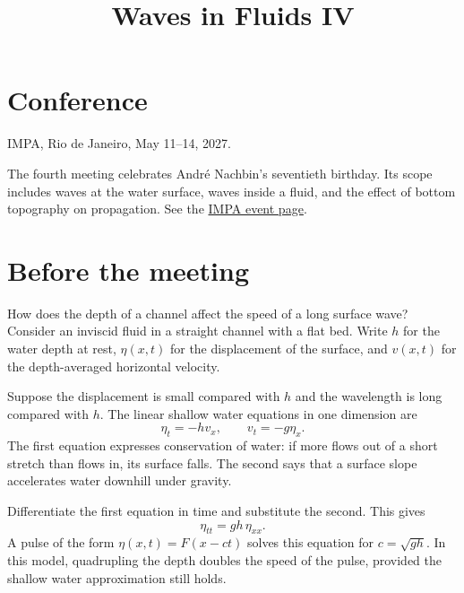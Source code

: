 



\title{Waves in Fluids IV}
\maketitle

\tableofcontents

\section{Conference}

IMPA, Rio de Janeiro, May 11--14, 2027.

The fourth meeting celebrates Andr\'e
Nachbin's seventieth birthday. Its scope
includes waves at the water surface, waves
inside a fluid, and the effect of bottom
topography on propagation. See the
\href{https://impa.br/evento/%
waves-in-fluids-iv/}{IMPA event page}.

\section{Before the meeting}

How does the depth of a channel affect the
speed of a long surface wave? Consider an
inviscid fluid in a straight channel with
a flat bed. Write $h$ for the water depth
at rest, $\eta(x,t)$ for the displacement
of the surface, and $v(x,t)$ for the
depth-averaged horizontal velocity.

Suppose the displacement is small compared
with $h$ and the wavelength is long
compared with $h$. The linear shallow
water equations in one dimension are
$$
\eta_t=-h v_x,\qquad v_t=-g\eta_x.
$$
The first equation expresses conservation
of water: if more flows out of a short
stretch than flows in, its surface falls.
The second says that a surface slope
accelerates water downhill under gravity.

Differentiate the first equation in time
and substitute the second. This gives
$$
\eta_{tt}=gh\,\eta_{xx}.
$$
A pulse of the form $\eta(x,t)=F(x-ct)$
solves this equation for $c=\sqrt{gh}$.
In this model, quadrupling the depth
doubles the speed of the pulse, provided
the shallow water approximation still
holds.


